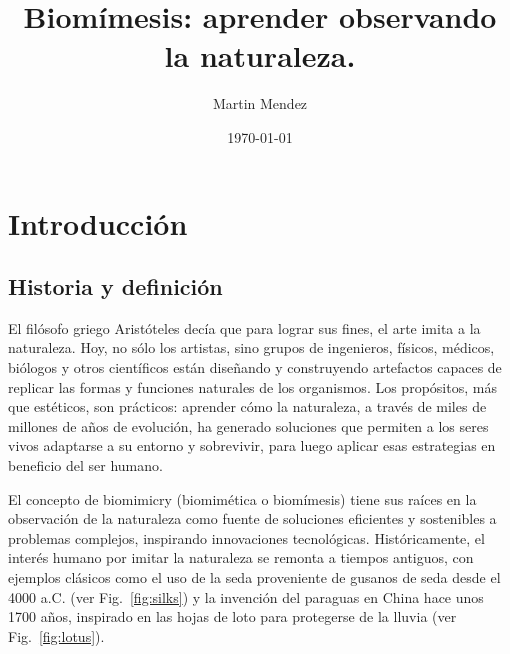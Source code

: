 \documentclass[twocolumn,amsmath,amssymb,aps,floatfix]{revtex4-2}
\begin{document}
\title{Biomímesis: aprender observando la naturaleza.}
\author{Martin Mendez}

\date{\today}

\maketitle

\tableofcontents

\section{Introducción}
\subsection{Historia y definición}

El filósofo griego Aristóteles decía que para lograr sus fines, el arte imita a la naturaleza. Hoy, no sólo los artistas, sino grupos de ingenieros,
físicos, médicos, biólogos y otros científicos están diseñando y construyendo artefactos capaces de replicar las formas y funciones naturales de los
organismos. Los propósitos, más que estéticos, son prácticos: aprender cómo la naturaleza, a través de miles de millones de años de evolución,
ha generado soluciones que permiten a los seres vivos adaptarse a su entorno y sobrevivir, para luego aplicar esas estrategias en beneficio
del ser humano.

El concepto de biomimicry (biomimética o biomímesis) tiene sus raíces en la observación de la naturaleza como fuente de soluciones eficientes y
sostenibles a problemas complejos, inspirando innovaciones tecnológicas. Históricamente, el interés humano por imitar la naturaleza se remonta a
tiempos antiguos, con ejemplos clásicos como el uso de la seda proveniente de gusanos de seda desde el 4000 a.C. (ver Fig.~\ref{fig:silks})
y la invención del paraguas en China hace unos 1700 años, inspirado en las hojas de loto para protegerse de la lluvia (ver Fig.~\ref{fig:lotus}).
\end{document}
